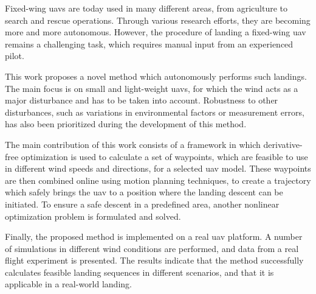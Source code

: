 Fixed-wing \acp{uav} are today used in many different areas, from agriculture to search and 
rescue operations. Through various research efforts, they are becoming more and more autonomous. However, the procedure of landing a fixed-wing \ac{uav} 
remains a challenging task, which requires manual input from an experienced pilot. 

This work proposes a novel method which autonomously performs such landings. The main focus is on 
small and light-weight \acp{uav}, for which the wind acts as a major disturbance and has to be taken into account. 
Robustness to other disturbances, such as variations in environmental factors or measurement errors, has also been prioritized during the development 
of this method.

The main contribution of this work consists of a framework in which der\-iva\-tive-free optimization is used to 
calculate a set of waypoints, which are feasible to use in different wind speeds and directions, for a selected \ac{uav} model. 
These waypoints are then combined online using motion planning techniques, to create a trajectory which safely brings the \ac{uav} to a 
position where the landing descent can be initiated. To ensure a safe descent in a predefined area, another nonlinear optimization problem is 
formulated and solved. 

Finally, the proposed method is implemented on a real \ac{uav} platform. A number of simulations in different wind conditions are performed, and data from 
a real flight experiment is presented. The results indicate that the method successfully calculates feasible landing sequences in different scenarios, and 
that it is applicable in a real-world landing.

